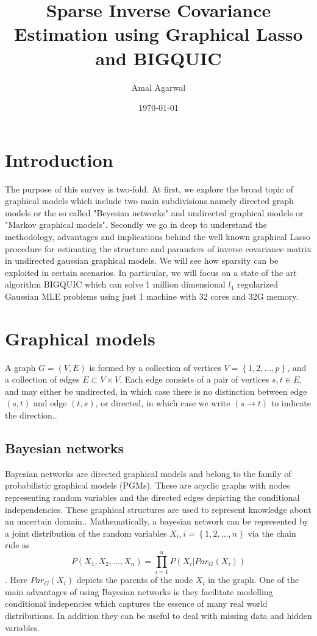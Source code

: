 \documentclass[12pt]{article}
\author{Amal Agarwal}
\title{Sparse Inverse Covariance Estimation using Graphical Lasso and BIGQUIC}
\date{\today}
\begin{document}
\maketitle

\section{Introduction} 
\label{sec:introduction}
The purpose of this survey is two-fold. At first, we explore the broad topic of graphical models which include two main subdivisions namely directed graph models or the so called "Beyesian networks" and undirected graphical models or "Markov graphical models". Secondly we go in deep to understand the methodology, advantages and implications behind the well known graphical Lasso procedure for estimating the structure and paramters of inverse covariance matrix in undirected gaussian graphical models. We will see how sparsity can be exploited in certain scenarios. In particular, we will focus on a state of the art algorithm BIGQUIC\cite{hsieh2013big} which can solve 1 million dimensional $l_1$ regularized Gaussian MLE problems using just 1 machine with 32 cores and 32G memory.

\section{Graphical models}
\label{gmodels}
A graph $G = (V,E)$ is formed by a collection of vertices
$V = \left\{1,2,...,p\right\}$, and a collection of edges $E\subset V\times V$. Each edge consists of a pair of vertices $s, t \in E$, and may either be undirected, in which case there is no distinction between edge $(s,t)$ and edge $(t,s)$, or directed, in which case we write $(s \rightarrow t)$ to indicate the direction.\cite{friedman2001elements}.

\subsection{Bayesian networks}
Bayesian networks are directed graphical models and belong to the family of probabilistic graphical models (PGMs). These are acyclic graphs with nodes representing random variables and the directed edges depicting the conditional independencies. These graphical structures are used to represent knowledge about an uncertain domain.\cite{ben2007bayesian}. Mathematically, a bayesian network can be represented by a joint distribution of the random variables $X_i, i=\left\{1,2,...,n\right\}$ via the chain rule as \[P(X_1,X_2,..., X_n)=\prod\limits_{i=1}^nP(X_i|Par_G(X_i))\]. Here $Par_G(X_i)$ depicts the parents of the node $X_i$ in the graph. One of the main advantages of using Bayesian networks is they facilitate modelling conditional indepencies which captures the essence of many real world distributions. In addition they can be useful to deal with missing data and hidden variables.
\end{document}
